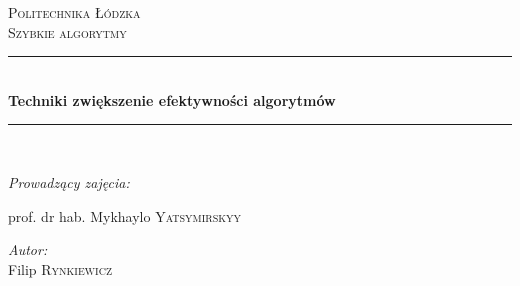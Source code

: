 \begin{titlepage}

\newcommand{\HRule}{\rule{\linewidth}{0.5mm}} %

\center %
 

\textsc{\LARGE Politechnika Łódzka}\\[1.5cm] %
\textsc{\Large Szybkie algorytmy}\\[0.5cm] %


\HRule \\[0.4cm]
{ \huge \bfseries Techniki zwiększenie efektywności algorytmów }\\[0.4cm] %
\HRule \\[1.5cm]
 



\begin{flushleft}\large

\begin{center} \emph{Prowadzący zajęcia:} \end{center}
\begin{center}
prof. dr hab. Mykhaylo \textsc{Yatsymirskyy}
\end{center} %
\end{flushleft}


\Large \emph{Autor:}\\
Filip \textsc{Rynkiewicz}\\[2cm] %




\end{titlepage}

